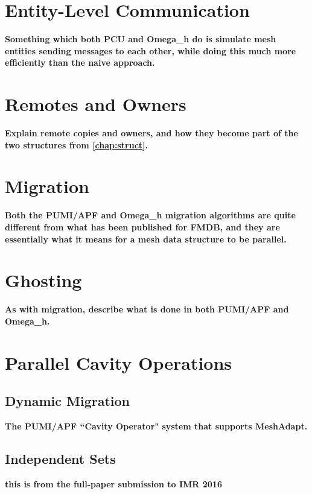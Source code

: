 \section{Entity-Level Communication}
\label{sec:dist}

{\bf Something which both PCU and Omega\_h do is simulate
mesh entities sending messages to each other, while
doing this much more efficiently than the naive approach.}

\section{Remotes and Owners}

{\bf Explain remote copies and owners, and how they become
part of the two structures from \ref{chap:struct}.}

\section{Migration}

{\bf Both the PUMI/APF and Omega\_h migration algorithms
are quite different from what has been published for FMDB,
and they are essentially what it means for a mesh
data structure to be parallel.}

\section{Ghosting}

{\bf As with migration, describe what is done in both PUMI/APF
and Omega\_h.}

\section{Parallel Cavity Operations}
\label{sec:cavity_sched}

\subsection{Dynamic Migration}
\label{sec:cavity_operator}

{\bf The PUMI/APF ``Cavity Operator" system that supports MeshAdapt.}

\subsection{Independent Sets}
\label{sec:indset}

{\bf this is from the full-paper submission to IMR 2016}


